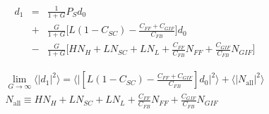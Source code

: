 \documentclass[a4paper,12pt]{jsarticle}
\begin{document}
\begin{eqnarray}
  d_1 &=& \frac{1}{1+G}P_{S}d_0 \\
  &+& \frac{G}{1+G}\Biggl[L(1-C_{SC})-\frac{C_{FF}+C_{GIF}}{C_{FB}}\Biggl]d_0 \nonumber \\
  &-& \frac{G}{1+G}\Biggl[HN_{H} + LN_{SC} + LN_{L} + \frac{C_{FF}}{C_{FB}}N_{FF} + \frac{C_{GIF}}{C_{FB}}N_{GIF} \Biggl] \nonumber
\end{eqnarray}

\begin{eqnarray}
  \lim_{G \to \infty} \langle|d_1|^2\rangle =
  \biggl\langle\biggl|[L(1-C_{SC})-\frac{C_{FF}+C_{GIF}}{C_{FB}}]d_0\biggl|^2\biggl\rangle + \langle|N_{\mathrm{all}}|^2 \rangle \\
N_{\mathrm{all}} \equiv HN_{H} + LN_{SC} + LN_{L} + \frac{C_{FF}}{C_{FB}}N_{FF} + \frac{C_{GIF}}{C_{FB}}N_{GIF} \nonumber
\end{eqnarray}
%
%



\end{document}
